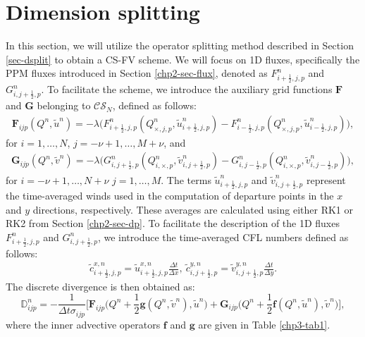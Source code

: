 \section{Dimension splitting}
\label{sec-csdsplit}
In this section, we will utilize the operator splitting method described in Section \ref{sec-dsplit} 
to obtain a CS-FV scheme.
We will focus on 1D fluxes, specifically the PPM fluxes introduced in Section \ref{chp2-sec-flux},
denoted as ${F}_{i+\frac{1}{2},j,p}^n$ and ${G}_{i,j+\frac{1}{2},p}^n$.
To facilitate the scheme, we introduce the auxiliary grid functions $\mathbf{F}$ and $\mathbf{G}$ belonging to $\mathcal{CS}_{N}$, defined as follows:
\begin{align*}
	\mathbf{F}_{ijp}({Q^n,\tilde{u}^n}) = -{\lambda} \bigg({F}_{i+\frac{1}{2},j,p}^n(Q^n_{\times,j,p},\tilde{u}^n_{i+\frac{1}{2},j,p})-
	{F}_{i-\frac{1}{2},j,p}^n(Q^n_{\times,j,p},\tilde{u}^n_{i-\frac{1}{2},j,p}) \bigg),
\end{align*}
for $i=1, \ldots, N$, $j=-\nu+1, \ldots, M + \nu$, and
\begin{align*}
	\mathbf{G}_{ijp}({Q^n,\tilde{v}^n}) = -{\lambda} \bigg({G}_{i,j+\frac{1}{2},p}^n(Q^n_{i,\times,p},\tilde{v}^n_{i,j+\frac{1}{2},p})-
	{G}_{i,j-\frac{1}{2},p}^n(Q^n_{i,\times,p},\tilde{v}^n_{i,j-\frac{1}{2},p}) \bigg),
\end{align*}
for $i=-\nu+1, \ldots, N + \nu$  $j=1, \ldots, M$.
The terms $\tilde{u}^n_{i+\frac{1}{2},j,p}$ and $\tilde{v}^n_{i,j+\frac{1}{2},p}$ represent the 
time-averaged winds used in the computation of departure points in the $x$ and $y$ directions, respectively. 
These averages are calculated using either RK1 or RK2 from Section \ref{chp2-sec-dp}. 
To facilitate the description of the 1D fluxes ${F}_{i+\frac{1}{2},j,p}^n$ and ${G}_{i,j+\frac{1}{2},p}^n$, 
we introduce the time-averaged CFL numbers defined as follows:
\begin{align*}
	\tilde{c}_{i+\frac{1}{2},j,p}^{x,n} = \tilde{u}_{i+\frac{1}{2},j,p}^{x,n}\frac{\Delta t}{\Delta x},\
	\tilde{c}_{i,j+\frac{1}{2},p}^{y,n} = \tilde{v}_{i,j+\frac{1}{2},p}^{y,n}\frac{\Delta t}{\Delta y}.
\end{align*}
The discrete divergence is then obtained as:
\begin{equation}
	\label{eqdiv-split}
	\mathbb{D}^n_{ijp} = -\frac{1}{\Delta t \sigma_{ijp}}
	\bigg[
	\mathbf{F}_{ijp}\bigg(Q^n + \frac{1}{2}\mathbf{g}(Q^n,\tilde{v}^n), \tilde{u}^n \bigg) 
	+\mathbf{G}_{ijp}\bigg(Q^n + \frac{1}{2}\mathbf{f}(Q^n,\tilde{u}^n), \tilde{v}^n \bigg) \bigg],
\end{equation}
where the inner advective operators $\mathbf{f}$ and $\mathbf{g}$ are given in Table \ref{chp3-tab1}.

